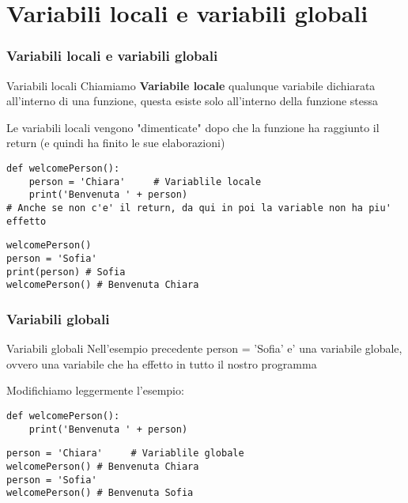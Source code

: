 \section{Variabili locali e variabili globali}

\begin{frame}[fragile]
\frametitle{Variabili locali e variabili globali}
    \begin{block}{Variabili locali}
        Chiamiamo \textbf{Variabile locale} qualunque variabile dichiarata all'interno di una funzione, questa esiste solo all'interno della funzione stessa
        
        Le variabili locali vengono "dimenticate" dopo che la funzione ha raggiunto il return (e quindi ha finito le sue elaborazioni)
    \end{block}
    
    \begin{lstlisting}
def welcomePerson():
    person = 'Chiara'     # Variablile locale
    print('Benvenuta ' + person)
# Anche se non c'e' il return, da qui in poi la variable non ha piu' effetto
    \end{lstlisting}
    
    \begin{lstlisting}
welcomePerson()
person = 'Sofia'
print(person) # Sofia
welcomePerson() # Benvenuta Chiara
    \end{lstlisting}
\end{frame}

\begin{frame}[fragile]
\frametitle{Variabili globali}
    \begin{block}{Variabili globali}
        Nell'esempio precedente person = 'Sofia' e' una variabile globale, ovvero una variabile che ha effetto in tutto il nostro programma
        
        Modifichiamo leggermente l'esempio:
    \end{block}
    
        \begin{lstlisting}
def welcomePerson():
    print('Benvenuta ' + person)
    \end{lstlisting}
    
    \begin{lstlisting}
person = 'Chiara'     # Variablile globale
welcomePerson() # Benvenuta Chiara
person = 'Sofia'
welcomePerson() # Benvenuta Sofia
    \end{lstlisting}
\end{frame}